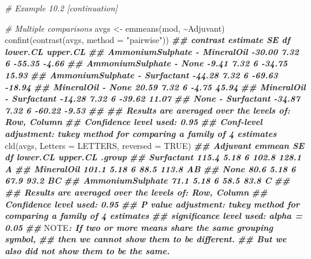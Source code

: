 \documentclass[
  12pt,
]{book}
\newenvironment{Shaded}{\begin{snugshade}}{\end{snugshade}}
\newcommand{\AlertTok}[1]{\textcolor[rgb]{0.94,0.16,0.16}{#1}}
\newcommand{\AttributeTok}[1]{\textcolor[rgb]{0.77,0.63,0.00}{#1}}
\newcommand{\CommentTok}[1]{\textcolor[rgb]{0.56,0.35,0.01}{\textit{#1}}}
\newcommand{\ConstantTok}[1]{\textcolor[rgb]{0.00,0.00,0.00}{#1}}
\newcommand{\DocumentationTok}[1]{\textcolor[rgb]{0.56,0.35,0.01}{\textbf{\textit{#1}}}}
\newcommand{\FunctionTok}[1]{\textcolor[rgb]{0.00,0.00,0.00}{#1}}
\newcommand{\NormalTok}[1]{#1}
\newcommand{\OtherTok}[1]{\textcolor[rgb]{0.56,0.35,0.01}{#1}}
\newcommand{\SpecialCharTok}[1]{\textcolor[rgb]{0.00,0.00,0.00}{#1}}
\newcommand{\StringTok}[1]{\textcolor[rgb]{0.31,0.60,0.02}{#1}}
\begin{document}
\begin{Shaded}
\begin{Highlighting}[]
\CommentTok{\# Example 10.2 [continuation]}

\CommentTok{\# Multiple comparisons}
\NormalTok{avgs }\OtherTok{\textless{}{-}} \FunctionTok{emmeans}\NormalTok{(mod, }\SpecialCharTok{\textasciitilde{}}\NormalTok{Adjuvant)}
\FunctionTok{confint}\NormalTok{(}\FunctionTok{contrast}\NormalTok{(avgs, }\AttributeTok{method =} \StringTok{"pairwise"}\NormalTok{))}
\DocumentationTok{\#\#  contrast                      estimate   SE df lower.CL upper.CL}
\DocumentationTok{\#\#  AmmoniumSulphate {-} MineralOil   {-}30.00 7.32  6   {-}55.35    {-}4.66}
\DocumentationTok{\#\#  AmmoniumSulphate {-} None          {-}9.41 7.32  6   {-}34.75    15.93}
\DocumentationTok{\#\#  AmmoniumSulphate {-} Surfactant   {-}44.28 7.32  6   {-}69.63   {-}18.94}
\DocumentationTok{\#\#  MineralOil {-} None                20.59 7.32  6    {-}4.75    45.94}
\DocumentationTok{\#\#  MineralOil {-} Surfactant         {-}14.28 7.32  6   {-}39.62    11.07}
\DocumentationTok{\#\#  None {-} Surfactant               {-}34.87 7.32  6   {-}60.22    {-}9.53}
\DocumentationTok{\#\# }
\DocumentationTok{\#\# Results are averaged over the levels of: Row, Column }
\DocumentationTok{\#\# Confidence level used: 0.95 }
\DocumentationTok{\#\# Conf{-}level adjustment: tukey method for comparing a family of 4 estimates}
\FunctionTok{cld}\NormalTok{(avgs, }\AttributeTok{Letters =}\NormalTok{ LETTERS, }\AttributeTok{reversed =} \ConstantTok{TRUE}\NormalTok{)}
\DocumentationTok{\#\#  Adjuvant         emmean   SE df lower.CL upper.CL .group}
\DocumentationTok{\#\#  Surfactant        115.4 5.18  6    102.8    128.1  A    }
\DocumentationTok{\#\#  MineralOil        101.1 5.18  6     88.5    113.8  AB   }
\DocumentationTok{\#\#  None               80.6 5.18  6     67.9     93.2   BC  }
\DocumentationTok{\#\#  AmmoniumSulphate   71.1 5.18  6     58.5     83.8    C  }
\DocumentationTok{\#\# }
\DocumentationTok{\#\# Results are averaged over the levels of: Row, Column }
\DocumentationTok{\#\# Confidence level used: 0.95 }
\DocumentationTok{\#\# P value adjustment: tukey method for comparing a family of 4 estimates }
\DocumentationTok{\#\# significance level used: alpha = 0.05 }
\DocumentationTok{\#\# }\AlertTok{NOTE}\DocumentationTok{: If two or more means share the same grouping symbol,}
\DocumentationTok{\#\#       then we cannot show them to be different.}
\DocumentationTok{\#\#       But we also did not show them to be the same.}
\end{Highlighting}
\end{Shaded}
\end{document}
